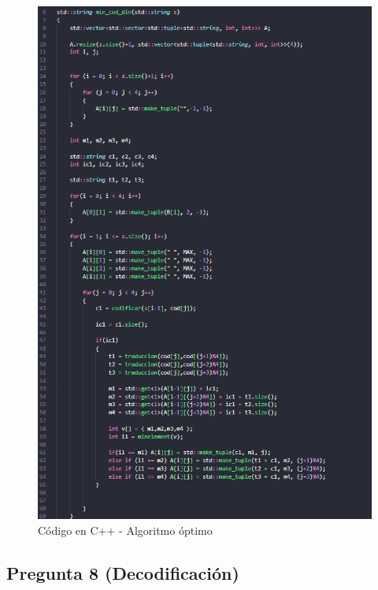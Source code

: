 \begin{figure}[H]
    \centering
    \includegraphics[scale = 0.4]{imagenes/optima.png}
    \caption{Código en C++ - Algoritmo óptimo}
\end{figure}


\subsection{Pregunta 8 (Decodificación)}

